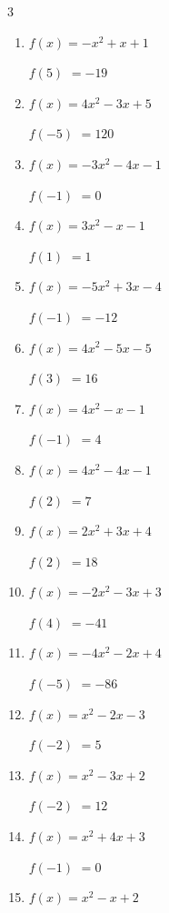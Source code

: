 \begin{multicols}{3}
\begin{enumerate}
$f(1)$
        $= 1$

\columnbreak %

  \item $f(x)=-x^{2}+x+1$

$f(5)$
        $= -19$

  \item $f(x)=4x^{2}-3x+5$

$f(-5)$
        $= 120$

  \item $f(x)=-3x^{2}-4x-1$

$f(-1)$
        $= 0$

  \item $f(x)=3x^{2}-x-1$

$f(1)$
        $= 1$

  \item $f(x)=-5x^{2}+3x-4$

$f(-1)$
        $= -12$

  \item $f(x)=4x^{2}-5x-5$

$f(3)$
        $= 16$

  \item $f(x)=4x^{2}-x-1$

$f(-1)$
        $= 4$

  \item $f(x)=4x^{2}-4x-1$

$f(2)$
        $= 7$

  \item $f(x)=2x^{2}+3x+4$

$f(2)$
        $= 18$

  \item $f(x)=-2x^{2}-3x+3$

$f(4)$
        $= -41$

  \item $f(x)=-4x^{2}-2x+4$

$f(-5)$
        $= -86$

  \item $f(x)=x^{2}-2x-3$

$f(-2)$
        $= 5$

  \item $f(x)=x^{2}-3x+2$

$f(-2)$
        $= 12$

  \item $f(x)=x^{2}+4x+3$

$f(-1)$
        $= 0$

  \item $f(x)=x^{2}-x+2$


\end{enumerate}
\end{multicols}
